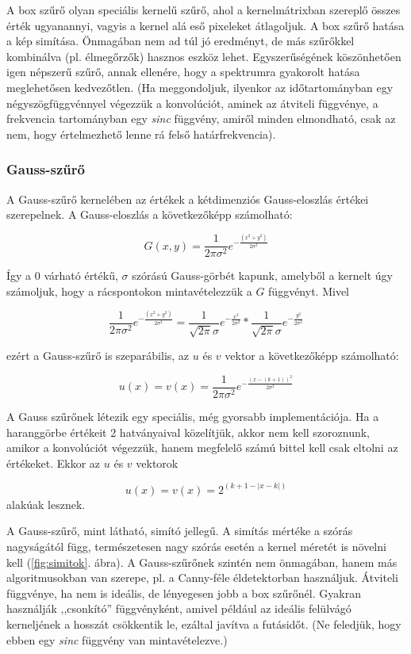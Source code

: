 \documentclass[a4paper,12pt]{article}
\begin{document}
A box szűrő olyan speciális kernelű szűrő, ahol a kernelmátrixban szereplő
összes érték ugyanannyi, vagyis a kernel alá eső pixeleket átlagoljuk. A box
szűrő hatása a kép simítása. Önmagában nem ad túl jó eredményt, de más szűrőkkel
kombinálva (pl. élmegőrzők) hasznos eszköz lehet. Egyszerűségének köszönhetően
igen népszerű szűrő, annak ellenére, hogy a spektrumra gyakorolt hatása
meglehetősen kedvezőtlen. (Ha meggondoljuk, ilyenkor az időtartományban egy
négyszögfüggvénnyel végezzük a konvolúciót, aminek az átviteli függvénye, a
frekvencia tartományban egy \textit{sinc} függvény, amiről minden elmondható,
csak az nem, hogy értelmezhető lenne rá felső határfrekvencia).

\subsubsection{Gauss-szűrő}

A Gauss-szűrő kernelében az értékek a kétdimenziós Gauss-eloszlás értékei
szerepelnek. A Gauss-eloszlás a következőképp számolható:

$$G(x,y)=\frac{1}{2\pi \sigma^2} e^{-\frac{(x^2 + y^2)}{2\sigma^2}}$$

Így a 0 várható értékű, $\sigma$ szórású Gauss-görbét kapunk, amelyből a kernelt
úgy számoljuk, hogy a rácspontokon mintavételezzük a $G$ függvényt. Mivel 

$$\frac{1}{2\pi \sigma^2}e^{-\frac{(x^2 + y^2)}{2\sigma^2}}=\frac{1}{\sqrt{2\pi}
	\sigma} e^{-\frac{x^2}{2\sigma^2}} \ast \frac{1}{\sqrt{2\pi} \sigma}
e^{-\frac{y^2}{2\sigma^2}}$$

ezért a Gauss-szűrő is szeparábilis, az $u$ és $v$ vektor a következőképp
számolható:

$$u(x)=v(x)=\frac{1}{2\pi \sigma^2} e^{-\frac{(x-(k+1))^2}{2\sigma^2}} $$

A Gauss szűrőnek létezik egy speciális, még gyorsabb implementációja. Ha a
haranggörbe értékeit 2 hatványaival közelítjük, akkor nem kell szoroznunk,
amikor a konvolúciót végezzük, hanem megfelelő számú bittel kell csak eltolni az
értékeket. Ekkor az $u$ és $v$ vektorok

$$u(x)=v(x)=2^{(k+1-|x-k|)}$$
alakúak lesznek.

A Gauss-szűrő, mint látható, simító jellegű. A simítás mértéke a szórás
nagyságától függ, természetesen nagy szórás esetén a kernel méretét is növelni
kell (\ref{fig:simitok}. ábra). A Gauss-szűrőnek szintén nem önmagában, hanem
más algoritmusokban van szerepe, pl. a Canny-féle éldetektorban használjuk.
Átviteli függvénye, ha nem is ideális, de lényegesen jobb a box szűrőnél.
Gyakran használják ,,csonkító'' függvényként, amivel például az ideális
felülvágó kerneljének a hosszát csökkentik le, ezáltal javítva a futásidőt. (Ne
feledjük, hogy ebben egy \emph{sinc} függvény van mintavételezve.)
\end{document}
